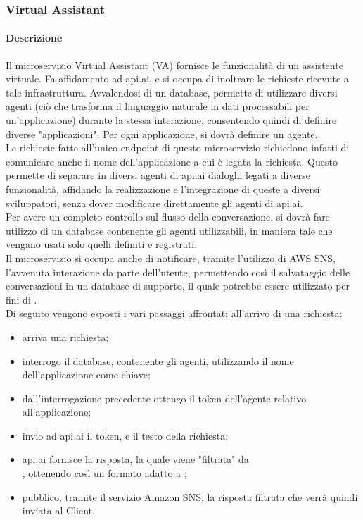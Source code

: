 \subsubsection{Virtual Assistant}
\paragraph{Descrizione}
Il microservizio Virtual Assistant (VA) fornisce le funzionalità di un assistente virtuale. Fa affidamento ad api.ai, e si occupa di inoltrare le richieste ricevute a tale infrastruttura. Avvalendosi di un database, permette di utilizzare diversi agenti (ciò che trasforma il linguaggio naturale in dati processabili per un'applicazione) durante la stessa interazione, consentendo quindi di definire diverse "applicazioni". Per ogni applicazione, si dovrà definire un agente.\\ Le richieste fatte all'unico endpoint di questo microservizio richiedono infatti di comunicare anche il nome dell'applicazione a cui è legata la richiesta. Questo permette di separare in diversi agenti di api.ai dialoghi legati a diverse funzionalità, affidando la realizzazione e l'integrazione di queste a diversi sviluppatori, senza dover modificare direttamente gli agenti di api.ai. \\
Per avere un completo controllo sul flusso della conversazione, si dovrà fare utilizzo di un database contenente gli agenti utilizzabili, in maniera tale che vengano usati solo quelli definiti e registrati.\\
Il microservizio si occupa anche di notificare, tramite l'utilizzo di AWS SNS, l'avvenuta interazione da parte dell'utente, permettendo così il salvataggio delle conversazioni in un database di supporto, il quale potrebbe essere utilizzato per fini di .\\
Di seguito vengono esposti i vari passaggi affrontati all'arrivo di una richiesta:
\begin{itemize}
	\item arriva una richiesta;
	\item interrogo il database, contenente gli agenti, utilizzando il nome dell'applicazione come chiave;
	\item dall'interrogazione precedente ottengo il token dell'agente relativo all'applicazione;
	\item invio ad api.ai il token, e il testo della richiesta;
	\item api.ai fornisce la risposta, la quale viene "filtrata" da\\ , ottenendo così un formato adatto a ;
	\item pubblico, tramite il servizio Amazon SNS, la risposta filtrata che verrà quindi inviata al Client.
\end{itemize}
